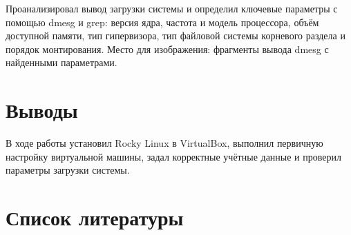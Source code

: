 \documentclass[
  english,
  russian,
  12pt,
  a4paper,
  DIV=11,
  numbers=noendperiod]{scrreprt}
\newcounter{none} %
\begin{document}
Проанализировал вывод загрузки системы и определил ключевые параметры с
помощью dmesg и grep: версия ядра, частота и модель процессора, объём
доступной памяти, тип гипервизора, тип файловой системы корневого
раздела и порядок монтирования. Место для изображения: фрагменты вывода
dmesg с найденными параметрами.

\chapter{Выводы}\label{ux432ux44bux432ux43eux434ux44b}

В ходе работы установил Rocky Linux в VirtualBox, выполнил первичную
настройку виртуальной машины, задал корректные учётные данные и проверил
параметры загрузки системы.

\chapter*{Список
литературы}\label{ux441ux43fux438ux441ux43eux43a-ux43bux438ux442ux435ux440ux430ux442ux443ux440ux44b}

\printbibliography[heading=none]
\end{document}
